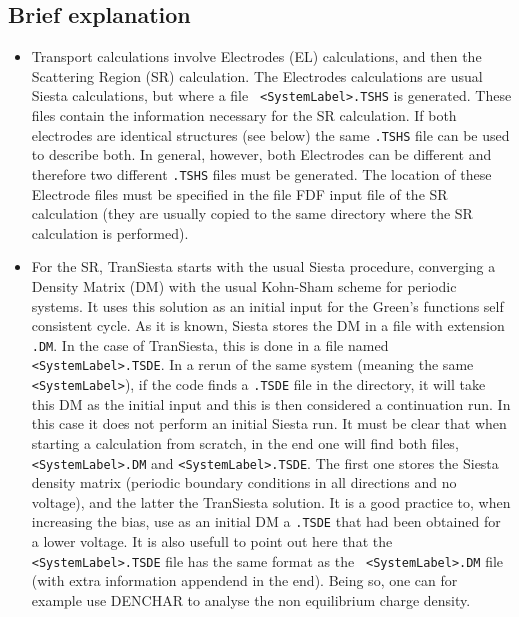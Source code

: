\documentclass[11pt]{article}
\begin{document}
\subsection{Brief explanation}

\begin{itemize}
\item 
Transport calculations involve Electrodes (EL) calculations, and then
the Scattering Region (SR) calculation.  The Electrodes calculations
are usual {\sc Siesta} calculations, but where a file {\tt
  <SystemLabel>.TSHS} is generated.  These files contain the
information necessary for the SR calculation.  If both electrodes are
identical structures (see below) the same {\tt .TSHS} file can be used
to describe both.  In general, however, both Electrodes can be
different and therefore two different {\tt .TSHS} files must be
generated.  The location of these Electrode files must be specified in
the file FDF input file of the SR calculation (they are usually copied
to the same directory where the SR calculation is performed).

\item
For the SR, {\sc TranSiesta} starts with the usual {\sc Siesta}
procedure, converging a Density Matrix (DM) with the usual Kohn-Sham
scheme for periodic systems. It uses this solution as an initial input
for the Green's functions self consistent cycle. As it is known, {\sc
  Siesta} stores the DM in a file with extension {\tt .DM}. In the
case of {\sc TranSiesta}, this is done in a file named {\tt
  <SystemLabel>.TSDE}.  In a rerun of the same system (meaning the
same {\tt <SystemLabel>}), if the code finds a {\tt.TSDE} file in the
directory, it will take this DM as the initial input and this is then
considered a continuation run. In this case it does not perform an
initial {\sc Siesta} run. It must be clear that when starting a
calculation from scratch, in the end one will find both files, {\tt
  <SystemLabel>.DM} and {\tt <SystemLabel>.TSDE}.  The first one
stores the {\sc Siesta} density matrix (periodic boundary conditions
in all directions and no voltage), and the latter the {\sc TranSiesta}
solution. It is a good practice to, when increasing the bias, use as
an initial DM a {\tt .TSDE} that had been obtained for a lower
voltage. It is also usefull to point out here that the {\tt
  <SystemLabel>.TSDE} file has the same format as the {\tt
  <SystemLabel>.DM} file (with extra information appendend in the
end). Being so, one can for example use DENCHAR to analyse the non
equilibrium charge density.


\end{itemize}
\end{document}
